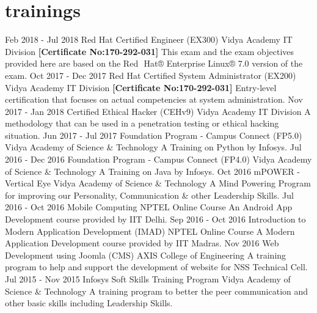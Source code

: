 \documentclass[]{friggeri-cv}
\begin{document}
\section{trainings}
\begin{entrylist}
	\entry
	{Feb 2018 - Jul 2018}
	{Red Hat Certified Engineer (EX300)}
	{Vidya Academy IT Division \newline \textbf{[Certificate No:170-292-031]}}
	{This exam and the exam objectives provided here are based on the Red  Hat® Enterprise Linux® 7.0 version of the exam.}
	\entry
	{Oct 2017 - Dec 2017}
	{Red Hat Certified System Administrator (EX200)}
	{Vidya Academy IT Division \newline \textbf{[Certificate No:170-292-031]}}
	{Entry-level certification that focuses on actual competencies at system administration.}
	\entry
	{Nov 2017 - Jan 2018}
	{Certified Ethical Hacker (CEHv9)}
	{Vidya Academy IT Division}
	{A methodology that can be used in a penetration testing or ethical hacking situation.}
	\entry
	{Jun 2017 - Jul 2017}
	{Foundation Program - Campus Connect (FP5.0)}
	{Vidya Academy of Science \& Technology}
	{A Training on Python by Infosys.}
	\entry
	{Jul 2016 - Dec 2016}
	{Foundation Program - Campus Connect (FP4.0)}
	{Vidya Academy of Science \& Technology}
	{A Training on Java by Infosys.}
	\entry
	{Oct 2016}
	{mPOWER - Vertical Eye}
	{Vidya Academy of Science \& Technology}
	{A Mind Powering Program for improving our Personality, Communication \& other Leadership Skills.}
    \entry
	{Jul 2016 - Oct 2016}
	{Mobile Computing}
	{NPTEL Online Course}
	{An Android App Development course provided by IIT Delhi.}
    \entry
	{Sep 2016 - Oct 2016}
	{Introduction to Modern Application Development (IMAD)}
	{NPTEL Online Course}
	{A Modern Application Development course provided by IIT Madras.}
    \entry
	{Nov 2016}
	{Web Development using Joomla (CMS)}
	{AXIS College of Engineering}
	{A training program to help and support the development of website for NSS Technical Cell.}
    \entry
	{Jul 2015 - Nov 2015}
	{Infosys Soft Skills Training Program}
	{Vidya Academy of Science \& Technology}
	{A training program to better the peer communication and other basic skills including Leadership Skills.}
\end{entrylist}
\end{document}
